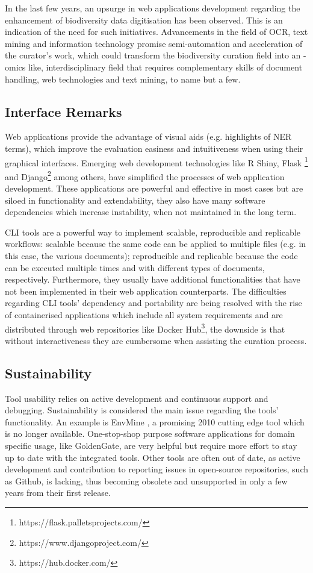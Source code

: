 In the last few years, an upsurge in web applications development regarding the
enhancement of biodiversity data digitisation has been observed. This is an
indication of the need for such initiatives. Advancements in the field of OCR,
text mining and information technology promise semi-automation and acceleration
of the curator’s work, which could transform the biodiversity curation field
into an -omics like, interdisciplinary field that requires complementary skills
of document handling, web technologies and text mining, to name but a few.

   \subsection{Interface Remarks}
   Web applications provide the advantage of visual aids (e.g. highlights of
NER terms), which improve the evaluation easiness and intuitiveness when using
their graphical interfaces. Emerging web development technologies like R Shiny,
Flask \footnote{https://flask.palletsprojects.com/} and
Django\footnote{https://www.djangoproject.com/} among others, have simplified
the processes of web application development. These applications are powerful
and effective in most cases but are siloed in functionality and extendability,
they also have many software dependencies which increase instability, when not
maintained in the long term.

CLI tools are a powerful way to implement scalable, reproducible and replicable
workflows: scalable because the same code can be applied to multiple files
(e.g. in this case, the various documents); reproducible and replicable because
the code can be executed multiple times and with different types of documents,
respectively. Furthermore, they usually have additional functionalities that
have not been implemented in their web application counterparts. The
difficulties regarding CLI tools’ dependency and portability are being resolved
with the rise of containerised applications which include all system
requirements and are distributed through web repositories like Docker
Hub\footnote{https://hub.docker.com/}, the downside is that without
interactiveness they are cumbersome when assisting the curation process.

   \subsection{Sustainability}
   Tool usability relies on active development and continuous support and
debugging. Sustainability is considered the main issue regarding the tools’
functionality. An example is EnvMine \citep{tamames_envmine_2010}, a promising
2010 cutting edge tool which is no longer available. One-stop-shop purpose
software applications for domain specific usage, like GoldenGate, are very
helpful but require more effort to stay up to date with the integrated tools.
Other tools are often out of date, as active development and contribution to
reporting issues in open-source repositories, such as Github, is lacking, thus
becoming obsolete and unsupported in only a few years from their first release.

